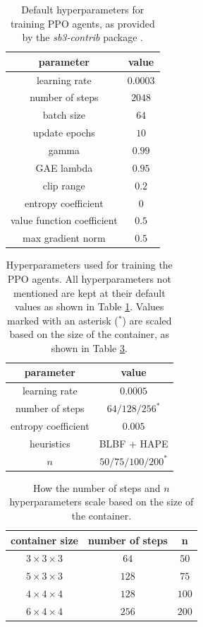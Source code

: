 \documentclass[conference]{IEEEtran}
\begin{document}
\begin{table}[!htb]
    \centering
    \caption{Default hyperparameters for training PPO agents, as provided  by the \textit{sb3-contrib} package \cite{stable-baselines3}.\label{tab:default-hyperparameters}}
    \begin{tabular}{c|c}
    \textbf{parameter} & \textbf{value} \\ \hline
    learning rate & $0.0003$ \\
    number of steps & $2048$ \\
    batch size & $64$ \\
    update epochs & $10$ \\
    gamma & $0.99$ \\
    GAE lambda & $0.95$ \\
    clip range & $0.2$ \\
    entropy coefficient & $0$ \\
    value function coefficient & $0.5$ \\
    max gradient norm & $0.5$
    \end{tabular}
\end{table}

\begin{table}[!htb]
    \centering
    \caption{Hyperparameters used for training the PPO agents. All hyperparameters not mentioned are kept at their default values as shown in Table \ref{tab:default-hyperparameters}. Values marked with an asterisk ($^\ast$) are scaled based on the size of the container, as shown in Table \ref{tab:scaling}.\label{tab:hyperparameters}}
    \begin{tabular}{c|c}
    \textbf{parameter} & \textbf{value} \\ \hline
    learning rate & $0.0005$ \\
    number of steps & $64 / 128 / 256^\ast$ \\
    entropy coefficient & $0.005$ \\
    heuristics & BLBF + HAPE \\
    $n$ & $50 / 75 / 100 / 200^\ast$
    \end{tabular}
\end{table}

\begin{table}[!htb]
    \centering
    \caption{How the number of steps and $n$ hyperparameters scale based on the size of the container.\label{tab:scaling}}
    \begin{tabular}{c|c|c}
    \textbf{container size} & \textbf{number of steps} & \textbf{n} \\ \hline
    $3 \times 3 \times 3$ & $64$ & $50$ \\
    $5 \times 3 \times 3$ & $128$ & $75$ \\
    $4 \times 4 \times 4$ & $128$ & $100$ \\
    $6 \times 4 \times 4$ & $256$ & $200$
    \end{tabular}
\end{table}
\end{document}
